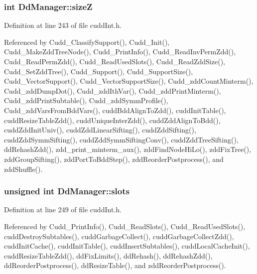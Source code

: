 \subsubsection{\setlength{\rightskip}{0pt plus 5cm}int \bf{Dd\-Manager::size\-Z}}\label{structDdManager_97821fdc39438a00a9b26f2205b0b2f5}




Definition at line 243 of file cudd\-Int.h.

Referenced by Cudd\_\-Classify\-Support(), Cudd\_\-Init(), Cudd\_\-Make\-Zdd\-Tree\-Node(), Cudd\_\-Print\-Info(), Cudd\_\-Read\-Inv\-Perm\-Zdd(), Cudd\_\-Read\-Perm\-Zdd(), Cudd\_\-Read\-Used\-Slots(), Cudd\_\-Read\-Zdd\-Size(), Cudd\_\-Set\-Zdd\-Tree(), Cudd\_\-Support(), Cudd\_\-Support\-Size(), Cudd\_\-Vector\-Support(), Cudd\_\-Vector\-Support\-Size(), Cudd\_\-zdd\-Count\-Minterm(), Cudd\_\-zdd\-Dump\-Dot(), Cudd\_\-zdd\-Ith\-Var(), Cudd\_\-zdd\-Print\-Minterm(), Cudd\_\-zdd\-Print\-Subtable(), Cudd\_\-zdd\-Symm\-Profile(), Cudd\_\-zdd\-Vars\-From\-Bdd\-Vars(), cudd\-Bdd\-Align\-To\-Zdd(), cudd\-Init\-Table(), cudd\-Resize\-Table\-Zdd(), cudd\-Unique\-Inter\-Zdd(), cudd\-Zdd\-Align\-To\-Bdd(), cudd\-Zdd\-Init\-Univ(), cudd\-Zdd\-Linear\-Sifting(), cudd\-Zdd\-Sifting(), cudd\-Zdd\-Symm\-Sifting(), cudd\-Zdd\-Symm\-Sifting\-Conv(), cudd\-Zdd\-Tree\-Sifting(), dd\-Rehash\-Zdd(), zdd\_\-print\_\-minterm\_\-aux(), zdd\-Find\-Node\-Hi\-Lo(), zdd\-Fix\-Tree(), zdd\-Group\-Sifting(), zdd\-Port\-To\-Bdd\-Step(), zdd\-Reorder\-Postprocess(), and zdd\-Shuffle().
\subsubsection{\setlength{\rightskip}{0pt plus 5cm}unsigned int \bf{Dd\-Manager::slots}}\label{structDdManager_8a0404c6d3d8c1e49ed84e4467c3387c}




Definition at line 249 of file cudd\-Int.h.

Referenced by Cudd\_\-Print\-Info(), Cudd\_\-Read\-Slots(), Cudd\_\-Read\-Used\-Slots(), cudd\-Destroy\-Subtables(), cudd\-Garbage\-Collect(), cudd\-Garbage\-Collect\-Zdd(), cudd\-Init\-Cache(), cudd\-Init\-Table(), cudd\-Insert\-Subtables(), cudd\-Local\-Cache\-Init(), cudd\-Resize\-Table\-Zdd(), dd\-Fix\-Limits(), dd\-Rehash(), dd\-Rehash\-Zdd(), dd\-Reorder\-Postprocess(), dd\-Resize\-Table(), and zdd\-Reorder\-Postprocess().
